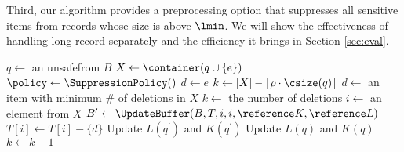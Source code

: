 
%

Third, our algorithm provides a
preprocessing option that suppresses all sensitive items
from records whose size is above $\lmin$.
We will show the effectiveness of handling long record separately
and the efficiency it brings in Section \ref{sec:eval}.

\begin{algorithm}[th]
\caption{$\SanitizeBuffer(\reference T, D_S, B, \reference K, \reference L)$}
\label{algo:sanitize}
\begin{algorithmic}[1]
\REPEAT
    \STATE $q\leftarrow$ an unsafe\qid from $B$
    \REPEAT
            \STATE $X \leftarrow \container(q\cup\{e\})$
            \STATE $\policy \leftarrow \SuppressionPolicy()$
            \IF {$\policy = \PartialR$}
              \STATE $d\leftarrow e$
              \STATE $k \leftarrow |X| - \lfloor\rho\cdot \csize(q)\rfloor$ \label{line:sanitize-k1}
            \ELSE
              \STATE $d\leftarrow$ an item with minimum \# of deletions in $X$
              \STATE $k\leftarrow$ the number of deletions \label{line:sanitize-k2}
            \ENDIF
             \label{line:sanitize-while-k}
                \STATE $i\leftarrow$ an element from $X$
                \STATE $ B^\prime \leftarrow \UpdateBuffer(B,T,i,i,\reference K,\reference L) $
                \STATE $T[i]\leftarrow T[i]-\{d\}$ \label{line:sanitize-suppress}
                    \STATE Update $L(q^\prime)$ and $K(q^\prime)$
                \ENDFOR
                    \STATE Update $L(q)$ and $K(q)$
                \ENDIF
                \STATE $k \leftarrow k-1$
            \ENDWHILE
        \ENDFOR
\end{algorithmic}
\end{algorithm}

